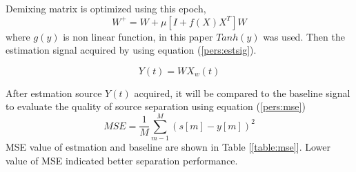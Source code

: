\documentclass[a4paper]{jpconf}
\begin{document}
Demixing matrix is optimized using this epoch,
\begin{equation}
W^+ = W + \mu\left[I + f(X)X^T\right]W
\end{equation}
where $g(y)$ is non linear function, in this paper $Tanh(y)$ was used. Then the estimation signal acquired by using equation (\ref{pers:estsig}).

\begin{equation}\label{pers:estsig}
Y(t) = WX_w(t)
\end{equation}

After estmation source $Y(t)$ acquired, it will be compared to the baseline signal to evaluate the quality of source separation using equation (\ref{pers:mse})
\begin{equation}\label{pers:mse}
MSE = \frac{1}{M} \sum_{m-1}^M \left(s[m] - y[m]\right)^2
\end{equation}
MSE value of estmation and baseline are shown in Table [\ref{table:mse}]. Lower value of MSE indicated better separation performance.
\end{document}
